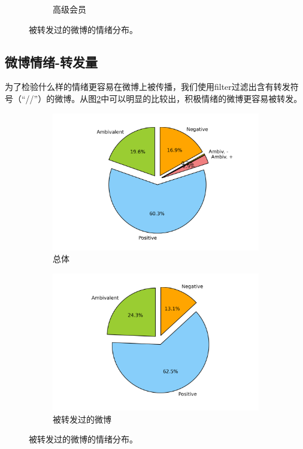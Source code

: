\documentclass[12pt, oneside]{article}
\begin{document}
\begin{spacing}{1.5}
\begin{CJK}{UTF8}{gbsn}
\begin{figure}
\begin{subfigure}[b]{0.3\linewidth}
		\caption{高级会员}
	\end{subfigure}
	\caption{被转发过的微博的情绪分布。}
	\label{fig:emotion_identification}
\end{figure}


\subsection{微博情绪-转发量}
为了检验什么样的情绪更容易在微博上被传播，我们使用filter过滤出含有转发符号（“//”）的微博。从图\ref{fig:emotion_forward}中可以明显的比较出，积极情绪的微博更容易被转发。

\begin{figure}
	\centering
	\begin{subfigure}[b]{0.45\linewidth}
		\centering
		\includegraphics[trim = 1.5cm 0 1.5cm 0, clip = true, width=\textwidth]{../result/charts/emotion_identification_all}
		\caption{总体}
	\end{subfigure}
	\begin{subfigure}[b]{0.45\linewidth}
		\centering
		\includegraphics[trim = 1.5cm 0 1.5cm 0, clip = true, width=\textwidth]{../result/charts/emotion_forward}
		\caption{被转发过的微博}
	\end{subfigure}
	\caption{被转发过的微博的情绪分布。}
	\label{fig:emotion_forward}
\end{figure}



\end{CJK}
\end{spacing}
\end{document}
